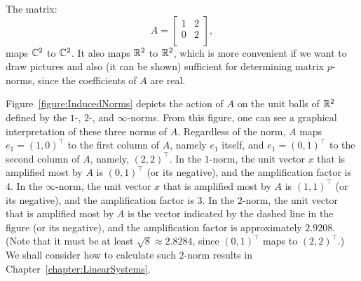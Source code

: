 \begin{example}
The matrix:
\begin{equation}
A = \begin{bmatrix}
1 & 2\\ 0 & 2\\
\end{bmatrix},
\end{equation}
maps $\mathbb{C}^2$ to $\mathbb{C}^2$. It also maps $\mathbb{R}^2$ to $\mathbb{R}^2$, which is more convenient if we want to draw pictures and also (it can be shown) sufficient for determining matrix $p$-norms, since the coefficients of $A$ are real.

Figure~\ref{figure:InducedNorms} depicts the action of $A$ on the unit balls of $\mathbb{R}^2$ defined by the $1$-, $2$-, and $\infty$-norms. From this figure, one can see a graphical interpretation of these three norms of $A$. Regardless of the norm, $A$ maps $e_1 = (1,0)^\top$ to the first column of $A$, namely $e_1$ itself, and $e_1=(0,1)^\top$ to the second column of $A$, namely, $(2,2)^\top$. In the $1$-norm, the unit vector $x$ that is amplified most by $A$ is $(0,1)^\top$ (or its negative), and the amplification factor is $4$. In the $\infty$-norm, the unit vector $x$ that is amplified most by $A$ is $(1,1)^\top$ (or its negative), and the amplification factor is $3$. In the $2$-norm, the unit vector that is amplified most by $A$ is the vector indicated by the dashed line in the figure (or its negative), and the amplification factor is approximately $2.9208$. (Note that it must be at least $\sqrt{8}\approx 2.8284$, since $(0,1)^\top$ maps to $(2,2)^\top$.) We shall consider how to calculate such $2$-norm results in Chapter~\ref{chapter:LinearSystems}.


\end{example}
